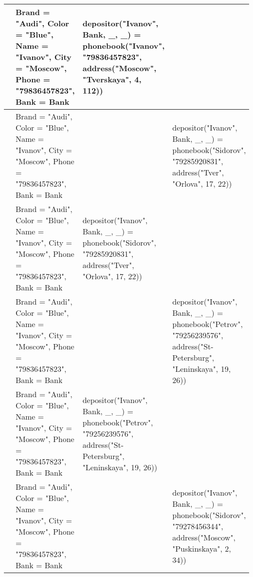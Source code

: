 \documentclass[a4paper,12pt]{article}
\begin{document}
\begin{table}[ht!] 
	\begin{tabularx}{\linewidth}{|>{\centering}p{1.5cm}|>{\centering}p{3.1cm}|>{\centering}X|>{\centering}X|}
		\hline
		54 & Brand = "Audi"{}, Color = "Blue"{}, Name = "Ivanov"{}, City = "Moscow"{}, Phone = "79836457823"{}, Bank = Bank & depositor("Ivanov"{}, Bank, \_, \_) = phonebook("Ivanov"{}, "79836457823"{}, address("Moscow"{}, "Tverskaya"{}, 4, 112)) & \tabularnewline
		\hline
		55 & Brand = "Audi"{}, Color = "Blue"{}, Name = "Ivanov"{}, City = "Moscow"{}, Phone = "79836457823"{}, Bank = Bank &  & depositor("Ivanov"{}, Bank, \_, \_) = phonebook("Sidorov"{}, "79285920831"{}, address("Tver"{}, "Orlova"{}, 17, 22)) \tabularnewline
		\hline
		56 & Brand = "Audi"{}, Color = "Blue"{}, Name = "Ivanov"{}, City = "Moscow"{}, Phone = "79836457823"{}, Bank = Bank & depositor("Ivanov"{}, Bank, \_, \_) = phonebook("Sidorov"{}, "79285920831"{}, address("Tver"{}, "Orlova"{}, 17, 22)) & \tabularnewline
		\hline
		57 & Brand = "Audi"{}, Color = "Blue"{}, Name = "Ivanov"{}, City = "Moscow"{}, Phone = "79836457823"{}, Bank = Bank &  & depositor("Ivanov"{}, Bank, \_, \_) = phonebook("Petrov"{}, "79256239576"{}, address("St-Petersburg"{}, "Leninskaya"{}, 19, 26)) \tabularnewline
		\hline
		58 & Brand = "Audi"{}, Color = "Blue"{}, Name = "Ivanov"{}, City = "Moscow"{}, Phone = "79836457823"{}, Bank = Bank & depositor("Ivanov"{}, Bank, \_, \_) = phonebook("Petrov"{}, "79256239576"{}, address("St-Petersburg"{}, "Leninskaya"{}, 19, 26)) & \tabularnewline
		\hline
		59 & Brand = "Audi"{}, Color = "Blue"{}, Name = "Ivanov"{}, City = "Moscow"{}, Phone = "79836457823"{}, Bank = Bank &  & depositor("Ivanov"{}, Bank, \_, \_) = phonebook("Sidorov"{}, "79278456344"{}, address("Moscow"{}, "Puskinskaya"{}, 2, 34)) \tabularnewline
		\hline
	\end{tabularx}
\end{table}
\newpage
\end{document}
